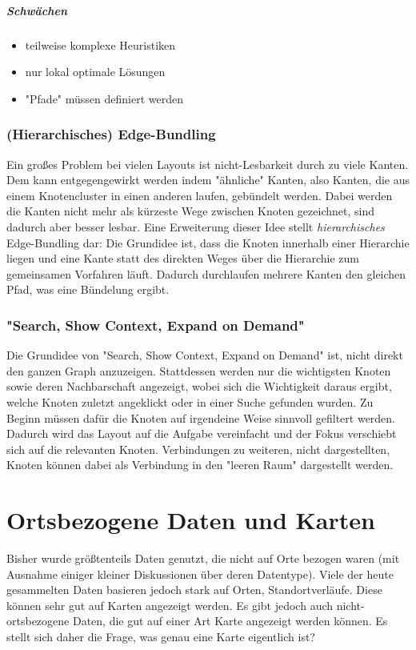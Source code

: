 					\subparagraph{Schwächen}
					\begin{itemize}
						\item teilweise komplexe Heuristiken
						\item nur lokal optimale Lösungen
						\item "Pfade" müssen \ggf definiert werden
					\end{itemize}

			\subsubsection{(Hierarchisches) Edge-Bundling}
				Ein großes Problem bei vielen Layouts ist nicht-Lesbarkeit durch zu viele Kanten. Dem kann entgegengewirkt werden indem "ähnliche" Kanten, also Kanten, die aus einem Knotencluster in einen anderen laufen, gebündelt werden. Dabei werden die Kanten nicht mehr als kürzeste Wege zwischen Knoten gezeichnet, sind dadurch aber besser lesbar. Eine Erweiterung dieser Idee stellt \emph{hierarchisches} Edge-Bundling dar: Die Grundidee ist, dass die Knoten innerhalb einer Hierarchie liegen und eine Kante statt des direkten Weges über die Hierarchie zum gemeinsamen Vorfahren läuft. Dadurch durchlaufen mehrere Kanten den gleichen Pfad, was eine Bündelung ergibt.

			\subsubsection{"Search, Show Context, Expand on Demand"}
				Die Grundidee von "Search, Show Context, Expand on Demand" ist, nicht direkt den ganzen Graph anzuzeigen. Stattdessen werden nur die wichtigsten Knoten sowie deren Nachbarschaft angezeigt, wobei sich die Wichtigkeit daraus ergibt, welche Knoten zuletzt angeklickt oder in einer Suche gefunden wurden. Zu Beginn müssen dafür die Knoten auf irgendeine Weise sinnvoll gefiltert werden. Dadurch wird das Layout auf die Aufgabe vereinfacht und der Fokus verschiebt sich auf die relevanten Knoten. Verbindungen zu weiteren, nicht dargestellten, Knoten können dabei als Verbindung in den "leeren Raum" dargestellt werden.

	\section{Ortsbezogene Daten und Karten}
		\label{sec:karten}

		Bisher wurde größtenteils Daten genutzt, die nicht auf Orte bezogen waren (mit Ausnahme einiger kleiner Diskussionen über deren Datentype). Viele der heute gesammelten Daten basieren jedoch stark auf Orten, \bspw Standortverläufe. Diese können sehr gut auf Karten angezeigt werden. Es gibt jedoch auch nicht-ortsbezogene Daten, die gut auf einer Art Karte angezeigt werden können. Es stellt sich daher die Frage, was genau eine Karte eigentlich ist?

